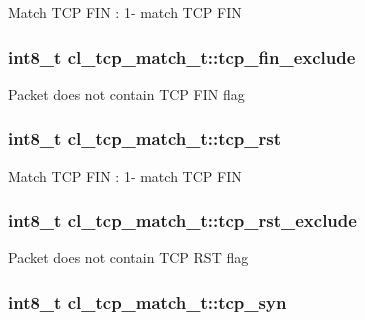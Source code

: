 Match T\-C\-P F\-I\-N \-: 1-\/ match T\-C\-P F\-I\-N \hypertarget{structcl__tcp__match__t_a37d15354a737db5db242fc78d9bf8437}{
\subsubsection[{tcp\-\_\-fin\-\_\-exclude}]{\setlength{\rightskip}{0pt plus 5cm}int8\-\_\-t cl\-\_\-tcp\-\_\-match\-\_\-t\-::tcp\-\_\-fin\-\_\-exclude}}\label{structcl__tcp__match__t_a37d15354a737db5db242fc78d9bf8437}
Packet does not contain T\-C\-P F\-I\-N flag \hypertarget{structcl__tcp__match__t_ae970db5f46617f16e947d5109f46de8b}{
\subsubsection[{tcp\-\_\-rst}]{\setlength{\rightskip}{0pt plus 5cm}int8\-\_\-t cl\-\_\-tcp\-\_\-match\-\_\-t\-::tcp\-\_\-rst}}\label{structcl__tcp__match__t_ae970db5f46617f16e947d5109f46de8b}
Match T\-C\-P F\-I\-N \-: 1-\/ match T\-C\-P F\-I\-N \hypertarget{structcl__tcp__match__t_aa9138e76adc06cc449ab22ceb00606de}{
\subsubsection[{tcp\-\_\-rst\-\_\-exclude}]{\setlength{\rightskip}{0pt plus 5cm}int8\-\_\-t cl\-\_\-tcp\-\_\-match\-\_\-t\-::tcp\-\_\-rst\-\_\-exclude}}\label{structcl__tcp__match__t_aa9138e76adc06cc449ab22ceb00606de}
Packet does not contain T\-C\-P R\-S\-T flag \hypertarget{structcl__tcp__match__t_a3054b277d565dff3f68fb560ee17b2c8}{
\subsubsection[{tcp\-\_\-syn}]{\setlength{\rightskip}{0pt plus 5cm}int8\-\_\-t cl\-\_\-tcp\-\_\-match\-\_\-t\-::tcp\-\_\-syn}}\label{structcl__tcp__match__t_a3054b277d565dff3f68fb560ee17b2c8}
